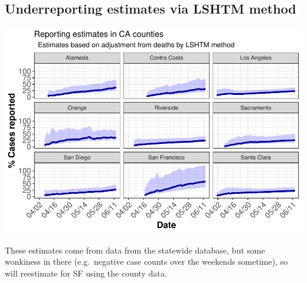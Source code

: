 \documentclass[
]{article}
\begin{document}
\hypertarget{underreporting-estimates-via-lshtm-method}{%
\subsection{Underreporting estimates via LSHTM
method}\label{underreporting-estimates-via-lshtm-method}}

\includegraphics{Testing_Writeup_files/figure-latex/LSHTM_underreporting-1.pdf}

These estimates come from data from the statewide database, but some
wonkiness in there (e.g.~negative case counts over the weekends
sometime), so will reestimate for SF using the county data.
\end{document}
